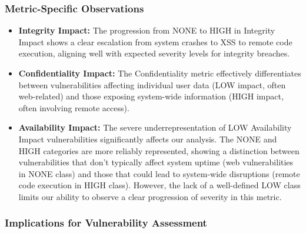 \documentclass[12pt]{article}
\begin{document}
\subsubsection{Metric-Specific Observations}

\begin{itemize}

	\item \textbf{Integrity Impact:} The progression from NONE to HIGH in Integrity Impact shows a
	      clear escalation from system crashes to XSS to remote code execution, aligning well with
	      expected severity levels for integrity breaches.

	\item \textbf{Confidentiality Impact:} The Confidentiality metric effectively differentiates
	      between vulnerabilities affecting individual user data (LOW impact, often web-related) and
	      those exposing system-wide information (HIGH impact, often involving remote access).

	\item \textbf{Availability Impact:} The severe underrepresentation of LOW Availability Impact
	      vulnerabilities significantly affects our analysis. The NONE and HIGH categories are more
	      reliably represented, showing a distinction between vulnerabilities that don't typically
	      affect system uptime (web vulnerabilities in NONE class) and those that could lead to
	      system-wide disruptions (remote code execution in HIGH class). However, the lack of a
	      well-defined LOW class limits our ability to observe a clear progression of severity in
	      this metric.

\end{itemize}

\subsubsection{Implications for Vulnerability Assessment}
\end{document}
